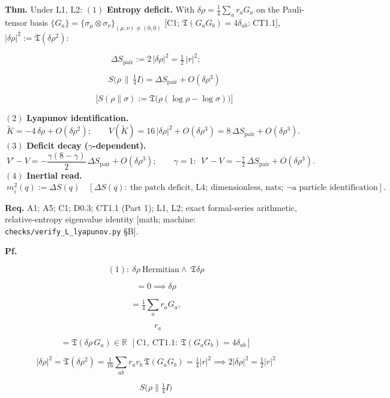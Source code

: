 \begin{theorem}\label{tag:L3}
\textbf{Thm.} Under L1, L2: $(1)$ \textbf{Entropy deficit.} With $\delta\rho=\tfrac14\sum_ar_aG_a$ on the Pauli-tensor basis $\{G_a\}=\{\sigma_\mu\otimes\sigma_\nu\}_{(\mu,\nu)\ne(0,0)}$ [C1; $\mathfrak T(G_aG_b)=4\delta_{ab}$: CT1.1], $|\delta\rho|^2:=\mathfrak T(\delta\rho^2)$:

\[
\Delta S_{\mathrm{pair}}:=2\,|\delta\rho|^2=\tfrac12\,|r|^2;
\]

\[
\qquad S\bigl(\rho\,\big\|\,\tfrac14I\bigr)=\Delta S_{\mathrm{pair}}+O(\delta\rho^3)
\]

\[
\qquad \bigl[S(\rho\|\sigma):=\mathfrak T\bigl(\rho(\log\rho-\log\sigma)\bigr)\bigr]
\]

$(2)$ \textbf{Lyapunov identification.} $\ \tilde K=-4\,\delta\rho+O(\delta\rho^2);\qquad V(\tilde K)=16\,|\delta\rho|^2+O(\delta\rho^3)=8\,\Delta S_{\mathrm{pair}}+O(\delta\rho^3).$ $(3)$ \textbf{Deficit decay ($\gamma$-dependent).} $\ V'-V=-\dfrac{\gamma(8-\gamma)}{2}\,\Delta S_{\mathrm{pair}}+O(\delta\rho^3);\qquad\gamma=1:\ \ V'-V=-\tfrac72\,\Delta S_{\mathrm{pair}}+O(\delta\rho^3).$ $(4)$ \textbf{Inertial read.} $\ m_i^2(q):=\Delta S(q)\quad[\Delta S(q):\ \text{the patch deficit, L4};\ \text{dimensionless, nats};\ \neg\text{a particle identification}].$

\textbf{Req.} A1; A5; C1; D0.3; CT1.1 (Part 1); L1, L2; exact formal-series arithmetic, relative-entropy eigenvalue identity [math; machine: \texttt{checks/\allowbreak{}verify\_\allowbreak{}L\_\allowbreak{}lyapunov.py} §B].

\textbf{Pf.}

\[
(1):\ \delta\rho\ \text{Hermitian}\wedge\ \mathfrak T\delta\rho
\]

\[
= 0\implies\delta\rho
\]

\[
= \tfrac14\sum_ar_aG_a,
\]

\[
\ \ r_a
\]

\[
= \mathfrak T(\delta\rho\,G_a)\in\mathbb R\ \ [\mathrm{C1},\ \mathrm{CT1.1}:\ \mathfrak T(G_aG_b)=4\delta_{ab}]
\]

\[
|\delta\rho|^2=\mathfrak T(\delta\rho^2)=\tfrac1{16}\sum_{ab}r_ar_b\,\mathfrak T(G_aG_b)=\tfrac14|r|^2\implies2|\delta\rho|^2=\tfrac12|r|^2
\]

\[
S\bigl(\rho\|\tfrac14I\bigr)
\]


\end{theorem}
